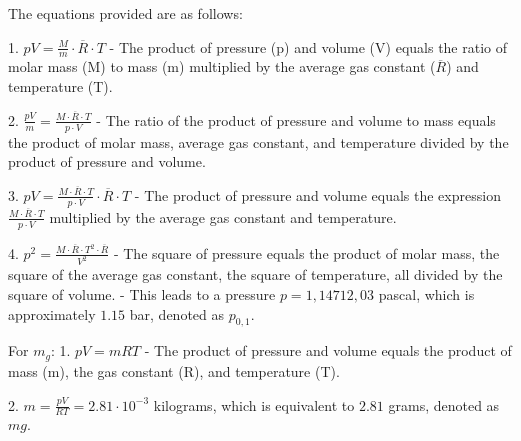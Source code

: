 The equations provided are as follows:

1. \( pV = \frac{M}{m} \cdot \overline{R} \cdot T \)
   - The product of pressure (p) and volume (V) equals the ratio of molar mass (M) to mass (m) multiplied by the average gas constant (\(\overline{R}\)) and temperature (T).

2. \( \frac{pV}{m} = \frac{M \cdot \overline{R} \cdot T}{p \cdot V} \)
   - The ratio of the product of pressure and volume to mass equals the product of molar mass, average gas constant, and temperature divided by the product of pressure and volume.

3. \( pV = \frac{M \cdot \overline{R} \cdot T}{p \cdot V} \cdot \overline{R} \cdot T \)
   - The product of pressure and volume equals the expression \(\frac{M \cdot \overline{R} \cdot T}{p \cdot V}\) multiplied by the average gas constant and temperature.

4. \( p^2 = \frac{M \cdot \overline{R} \cdot T^2 \cdot \overline{R}}{V^2} \)
   - The square of pressure equals the product of molar mass, the square of the average gas constant, the square of temperature, all divided by the square of volume.
   - This leads to a pressure \( p = 1,14712,03 \) pascal, which is approximately \( 1.15 \) bar, denoted as \( p_{0,1} \).

For \( m_g \):
1. \( pV = mRT \)
   - The product of pressure and volume equals the product of mass (m), the gas constant (R), and temperature (T).

2. \( m = \frac{pV}{RT} = 2.81 \cdot 10^{-3} \) kilograms, which is equivalent to \( 2.81 \) grams, denoted as \( mg \).